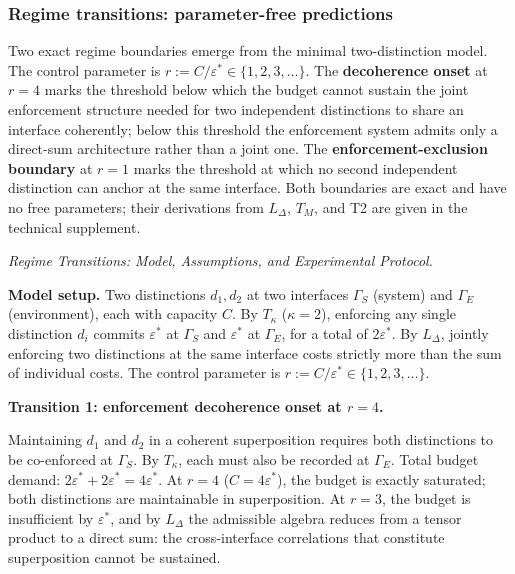 \documentclass[11pt]{article}
\theoremstyle{remark}
\begin{document}
\subsubsection*{Regime transitions: parameter-free predictions}
\label{sec:regime_models_full}

Two exact regime boundaries emerge from the minimal two-distinction model.  The control parameter is $r := C/\varepsilon^* \in \{1, 2, 3, \ldots\}$.  The \textbf{decoherence onset} at $r = 4$ marks the threshold below which the budget cannot sustain the joint enforcement structure needed for two independent distinctions to share an interface coherently; below this threshold the enforcement system admits only a direct-sum architecture rather than a joint one.  The \textbf{enforcement-exclusion boundary} at $r = 1$ marks the threshold at which no second independent distinction can anchor at the same interface.  Both boundaries are exact and have no free parameters; their derivations from $L_\Delta$, $T_M$, and T2 are given in the technical supplement.


\medskip\noindent\textit{Regime Transitions: Model, Assumptions, and Experimental Protocol.}
\label{box:regime_experimental}

\noindent\textbf{Model setup.}  Two distinctions $d_1, d_2$ at two interfaces $\Gamma_S$ (system) and $\Gamma_E$ (environment), each with capacity $C$.  By $T_\kappa$ ($\kappa = 2$), enforcing any single distinction $d_i$ commits $\varepsilon^*$ at $\Gamma_S$ and $\varepsilon^*$ at $\Gamma_E$, for a total of $2\varepsilon^*$.  By $L_\Delta$, jointly enforcing two distinctions at the same interface costs strictly more than the sum of individual costs.  The control parameter is $r := C/\varepsilon^* \in \{1, 2, 3, \ldots\}$.

\medskip\noindent\textbf{Transition 1: enforcement decoherence onset at $r = 4$.}

Maintaining $d_1$ and $d_2$ in a coherent superposition requires both distinctions to be co-enforced at $\Gamma_S$.  By $T_\kappa$, each must also be recorded at $\Gamma_E$.  Total budget demand: $2\varepsilon^* + 2\varepsilon^* = 4\varepsilon^*$.  At $r = 4$ ($C = 4\varepsilon^*$), the budget is exactly saturated; both distinctions are maintainable in superposition.  At $r = 3$, the budget is insufficient by $\varepsilon^*$, and by $L_\Delta$ the admissible algebra reduces from a tensor product to a direct sum: the cross-interface correlations that constitute superposition cannot be sustained.
\end{document}
